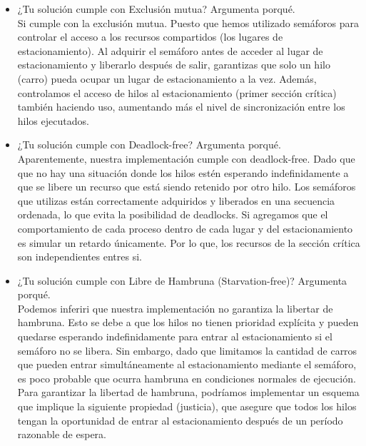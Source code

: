 \documentclass[10pt,letterpaper]{article}
\begin{document}
    \begin{itemize}
        \item ¿Tu solución cumple con Exclusión mutua? Argumenta porqué.\\
        Si cumple con la exclusión mutua. Puesto que hemos utilizado semáforos para controlar el acceso a los recursos compartidos (los lugares de estacionamiento). Al adquirir el semáforo antes de acceder al lugar de estacionamiento y liberarlo después de salir, garantizas que solo un hilo (carro) pueda ocupar un lugar de estacionamiento a la vez. Además, controlamos el acceso de hilos al estacionamiento (primer sección crítica) también haciendo uso, aumentando más el nivel de sincronización entre los hilos ejecutados.

        \item ¿Tu solución cumple con Deadlock-free? Argumenta porqué.\\
        Aparentemente, nuestra implementación cumple con deadlock-free. Dado que que no hay una situación donde los hilos estén esperando indefinidamente a que se libere un recurso que está siendo retenido por otro hilo. Los semáforos que utilizas están correctamente adquiridos y liberados en una secuencia ordenada, lo que evita la posibilidad de deadlocks. Si agregamos que el comportamiento de cada proceso dentro de cada lugar y del estacionamiento es simular un retardo únicamente. Por lo que, los recursos de la sección crítica son independientes entres si.

        \item ¿Tu solución cumple con Libre de Hambruna (Starvation-free)? Argumenta porqué.\\
        Podemos inferiri que nuestra implementación no garantiza la libertar de hambruna. Esto se debe a que los hilos no tienen prioridad explícita y pueden quedarse esperando indefinidamente para entrar al estacionamiento si el semáforo no se libera. Sin embargo, dado que limitamos la cantidad de carros que pueden entrar simultáneamente al estacionamiento mediante el semáforo, es poco probable que ocurra hambruna en condiciones normales de ejecución. Para garantizar la libertad de hambruna, podríamos implementar un esquema que implique la siguiente propiedad (justicia), que asegure que todos los hilos tengan la oportunidad de entrar al estacionamiento después de un período razonable de espera.


\end{itemize}
\end{document}
